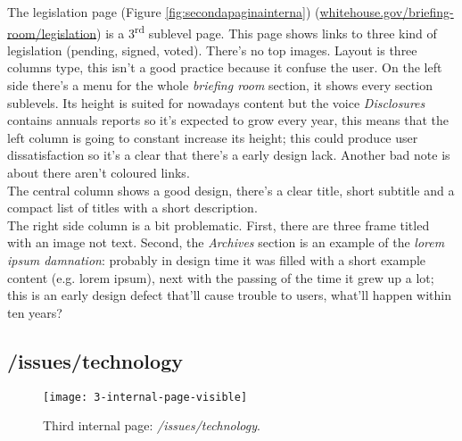 \documentclass[
12pt, %
a4paper, %
oneside, %
headinclude,footinclude, %
BCOR5mm, %
]{scrartcl}
\begin{document}
	
	The legislation page (Figure \ref{fig:secondapaginainterna}) (\href{http://www.whitehouse.gov/briefing-room/legislation}{whitehouse.gov/briefing-room/legislation}) is a 3\textsuperscript{rd} sublevel page. This page shows links to three kind of legislation (pending, signed, voted). There's no top images. Layout is three columns type, this isn't a good practice because it confuse the user. On the left side there's a menu for the whole \emph{briefing room} section, it shows every section sublevels. Its height is suited for nowadays content but the voice \emph{Disclosures} contains annuals reports so it's expected to grow every year, this means that the left column is going to constant increase its height; this could produce user dissatisfaction so it's a clear that there's a early design lack. Another bad note is about there aren't coloured links. \\
	The central column shows a good design, there's a clear title, short subtitle and a compact list of titles with a short description. \\
	The right side column is a bit problematic. First, there are three frame titled with an image not text. Second, the \emph{Archives} section is an example of the \emph{lorem ipsum damnation}: probably in design time it was filled with a short example content (e.g. lorem ipsum), next with the passing of the time it grew up a lot; this is an early design defect that'll cause trouble to users, what'll happen within ten years?
	

	\subsection{/issues/technology}

	\begin{figure}[h!]
	\centering 
	\centerline{\texttt{[image: 3-internal-page-visible]}}
	\caption[Third internal page: /issues/technology]{Third internal page: \emph{/issues/technology}.}
	\label{fig:terzapaginainterna} 
	\end{figure}
	
\end{document}

